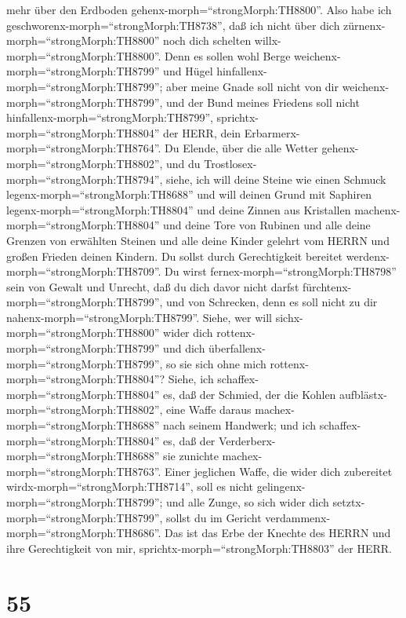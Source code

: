mehr über den Erdboden gehenx-morph=``strongMorph:TH8800''. Also habe
ich geschworenx-morph=``strongMorph:TH8738'', daß ich nicht über dich
zürnenx-morph=``strongMorph:TH8800'' noch dich schelten
willx-morph=``strongMorph:TH8800''.  Denn es sollen wohl
Berge weichenx-morph=``strongMorph:TH8799'' und Hügel
hinfallenx-morph=``strongMorph:TH8799''; aber meine Gnade soll nicht von
dir weichenx-morph=``strongMorph:TH8799'', und der Bund meines Friedens
soll nicht hinfallenx-morph=``strongMorph:TH8799'',
sprichtx-morph=``strongMorph:TH8804'' der HERR, dein
Erbarmerx-morph=``strongMorph:TH8764''.  Du Elende, über
die alle Wetter gehenx-morph=``strongMorph:TH8802'', und du
Trostlosex-morph=``strongMorph:TH8794'', siehe, ich will deine Steine
wie einen Schmuck legenx-morph=``strongMorph:TH8688'' und will deinen
Grund mit Saphiren legenx-morph=``strongMorph:TH8804''  und
deine Zinnen aus Kristallen machenx-morph=``strongMorph:TH8804'' und
deine Tore von Rubinen und alle deine Grenzen von erwählten Steinen
 und alle deine Kinder gelehrt vom HERRN und großen Frieden
deinen Kindern.  Du sollst durch Gerechtigkeit bereitet
werdenx-morph=``strongMorph:TH8709''. Du wirst
fernex-morph=``strongMorph:TH8798'' sein von Gewalt und Unrecht, daß du
dich davor nicht darfst fürchtenx-morph=``strongMorph:TH8799'', und von
Schrecken, denn es soll nicht zu dir
nahenx-morph=``strongMorph:TH8799''.  Siehe, wer will
sichx-morph=``strongMorph:TH8800'' wider dich
rottenx-morph=``strongMorph:TH8799'' und dich
überfallenx-morph=``strongMorph:TH8799'', so sie sich ohne mich
rottenx-morph=``strongMorph:TH8804''?  Siehe, ich
schaffex-morph=``strongMorph:TH8804'' es, daß der Schmied, der die
Kohlen aufblästx-morph=``strongMorph:TH8802'', eine Waffe daraus
machex-morph=``strongMorph:TH8688'' nach seinem Handwerk; und ich
schaffex-morph=``strongMorph:TH8804'' es, daß der
Verderberx-morph=``strongMorph:TH8688'' sie zunichte
machex-morph=``strongMorph:TH8763''.  Einer jeglichen
Waffe, die wider dich zubereitet wirdx-morph=``strongMorph:TH8714'',
soll es nicht gelingenx-morph=``strongMorph:TH8799''; und alle Zunge, so
sich wider dich setztx-morph=``strongMorph:TH8799'', sollst du im
Gericht verdammenx-morph=``strongMorph:TH8686''. Das ist das Erbe der
Knechte des HERRN und ihre Gerechtigkeit von mir,
sprichtx-morph=``strongMorph:TH8803'' der HERR.

\hypertarget{section-54}{%
\section{55}\label{section-54}}

